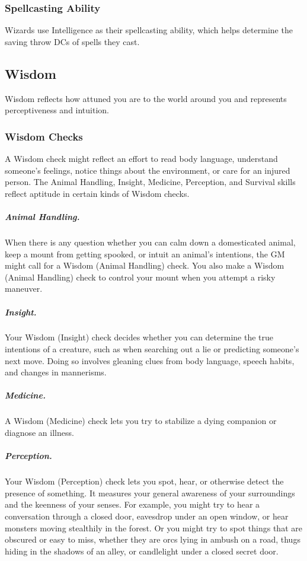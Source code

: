 \subsubsection{Spellcasting Ability}

Wizards use Intelligence as their spellcasting ability, which helps determine the saving throw DCs of spells they cast.

\subsection{Wisdom}

Wisdom reflects how attuned you are to the world around you and represents perceptiveness and intuition.

\subsubsection{Wisdom Checks}

A Wisdom check might reflect an effort to read body language, understand someone's feelings, notice things about the environment, or care for an injured person. The Animal Handling, Insight, Medicine, Perception, and Survival skills reflect aptitude in certain kinds of Wisdom checks.

\subparagraph*{Animal Handling.} When there is any question whether you can calm down a domesticated animal, keep a mount from getting spooked, or intuit an animal's intentions, the GM might call for a Wisdom (Animal Handling) check. You also make a Wisdom (Animal Handling) check to control your mount when you attempt a risky maneuver.

\subparagraph*{Insight.} Your Wisdom (Insight) check decides whether you can determine the true intentions of a creature, such as when searching out a lie or predicting someone's next move. Doing so involves gleaning clues from body language, speech habits, and changes in mannerisms.

\subparagraph*{Medicine.} A Wisdom (Medicine) check lets you try to stabilize a dying companion or diagnose an illness.

\subparagraph*{Perception.} Your Wisdom (Perception) check lets you spot, hear, or otherwise detect the presence of something. It measures your general awareness of your surroundings and the keenness of your senses. For example, you might try to hear a conversation through a closed door, eavesdrop under an open window, or hear monsters moving stealthily in the forest. Or you might try to spot things that are obscured or easy to miss, whether they are orcs lying in ambush on a road, thugs hiding in the shadows of an alley, or candlelight under a closed secret door.

